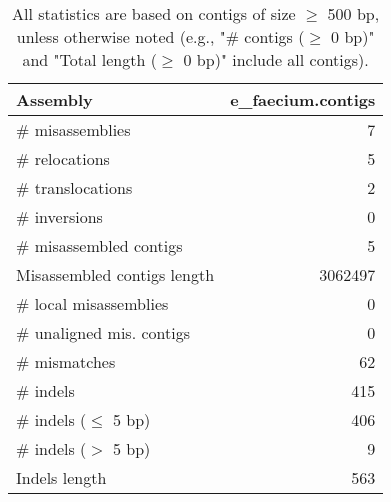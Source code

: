 \documentclass[12pt,a4paper]{article}
\begin{document}
\begin{table}[ht]
\begin{center}
\caption{All statistics are based on contigs of size $\geq$ 500 bp, unless otherwise noted (e.g., "\# contigs ($\geq$ 0 bp)" and "Total length ($\geq$ 0 bp)" include all contigs).}
\begin{tabular}{|l*{1}{|r}|}
\hline
Assembly & e\_faecium.contigs \\ \hline
\# misassemblies & 7 \\ \hline
\hspace{5mm}\# relocations & 5 \\ \hline
\hspace{5mm}\# translocations & 2 \\ \hline
\hspace{5mm}\# inversions & 0 \\ \hline
\# misassembled contigs & 5 \\ \hline
Misassembled contigs length & 3062497 \\ \hline
\# local misassemblies & 0 \\ \hline
\# unaligned mis. contigs & 0 \\ \hline
\# mismatches & 62 \\ \hline
\# indels & 415 \\ \hline
\hspace{5mm}\# indels ($\leq$ 5 bp) & 406 \\ \hline
\hspace{5mm}\# indels ($>$ 5 bp) & 9 \\ \hline
Indels length & 563 \\ \hline
\end{tabular}
\end{center}
\end{table}
\end{document}
